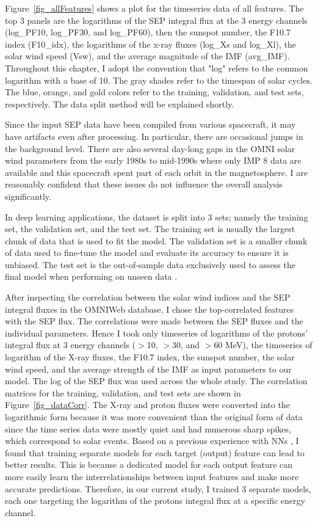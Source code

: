 Figure~\ref{fig_allFeatures} shows a plot for the timeseries data of all features. The top 3 panels are the logarithms of the SEP integral flux at the 3 energy channels (log\_PF10, log\_PF30, and log\_PF60), then the sunspot number, the F10.7 index (F10\_idx), the logarithms of the x-ray fluxes (log\_Xs and log\_Xl), the solar wind speed (Vsw), and the average magnitude of the IMF (avg\_IMF).
Throughout this chapter, I adopt the convention that "log" refers to the common logarithm with a base of 10.
The gray shades refer to the timespan of solar cycles.
The blue, orange, and gold colors refer to the training, validation, and test sets, respectively. The data split method will be explained shortly.

Since the input SEP data have been compiled from various spacecraft, it may have artifacts even after processing. In particular, there are occasional jumps in the background level. There are also several day-long gaps in the OMNI solar wind parameters from the early 1980s to mid-1990s where only IMP 8 data are available and this spacecraft spent part of each orbit in the magnetosphere. I are reasonably confident that these issues do not influence the overall analysis significantly.

In deep learning applications, the dataset is split into 3 sets; namely the training set, the validation set, and the test set. The training set is usually the largest chunk of data that is used to fit the model. The validation set is a smaller chunk of data used to fine-tune the model and evaluate its accuracy to ensure it is unbiased. The test set is the out-of-sample data exclusively used to assess the final model when performing on unseen data \citep{ripley_2007}.

After inspecting the correlation between the solar wind indices and the SEP integral fluxes in the OMNIWeb database, I chose the top-correlated features with the SEP flux. The correlations were made between the SEP fluxes and the individual parameters. Hence I took only timeseries of logarithms of the protons' integral flux at 3 energy channels ($>$10, $>$30, and $>$60 MeV), the timeseries of logarithm of the X-ray fluxes, the F10.7 index, the sunspot number, the solar wind speed, and the average strength of the IMF as input parameters to our model.
The log of the SEP flux was used across the whole study.
The correlation matrices for the training, validation, and test sets are shown in Figure~\ref{fig_dataCorr}.
The X-ray and proton fluxes were converted into the logarithmic form because it was more convenient than the original form of data since the time series data were mostly quiet and had numerous sharp spikes, which correspond to solar events.
Based on a previous experience with NNs \citep{mnedal_2019}, I found that training separate models for each target (output) feature can lead to better results. This is because a dedicated model for each  output feature can more easily learn the interrelationships between input features and make more accurate predictions. Therefore, in our current study, I trained 3 separate models, each one targeting the logarithm of the protons integral flux at a specific energy channel.

